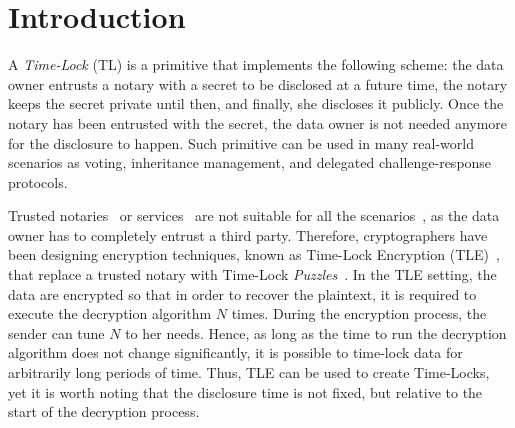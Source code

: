 \section{Introduction}\label{sect:introduction}



A \textit{Time-Lock} (TL) is a primitive that implements the following scheme:
the data owner entrusts a notary with a secret to be disclosed at a future time, the notary keeps the secret private until then, and finally, she discloses it publicly. Once the notary has been entrusted with the secret, the data owner is not needed anymore for the disclosure to happen.
Such primitive can be used in many real-world scenarios as voting, inheritance management, and delegated challenge-response protocols.

Trusted notaries~\cite{10.1007/BFb0032349} or services~\cite{rabin2006time} are not suitable for all the scenarios~\cite{Abelson:1997:RKR:275079.275104}, as the data owner has to completely entrust a third party.
Therefore, cryptographers have been designing encryption techniques, known as Time-Lock Encryption (TLE)~\cite{may1993timed}, that replace a trusted notary with Time-Lock {\em Puzzles}~\cite{mahmoody-tl,Bitansky:2016:TPR:2840728.2840745}.
In the TLE setting, the data are encrypted so that in order to recover the plaintext, it is required to execute the decryption algorithm $N$ times.
During the encryption process, the sender can tune $N$ to her needs.
Hence, as long as the time to run the decryption algorithm does not change significantly, it is possible to time-lock data for arbitrarily long periods of time.
Thus, TLE can be used to create Time-Locks, yet it is worth noting that the disclosure time is not fixed, but relative to the start of the decryption process.

